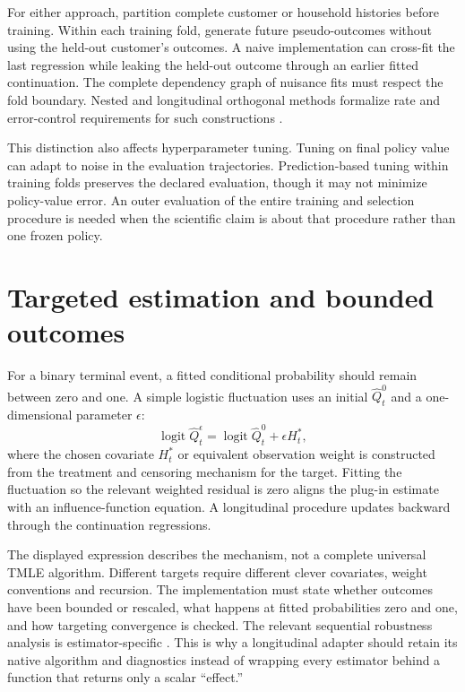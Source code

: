 For either approach, partition complete customer or household histories
before training. Within each training fold, generate future pseudo-outcomes
without using the held-out customer's outcomes. A naive implementation can
cross-fit the last regression while leaking the held-out outcome through
an earlier fitted continuation. The complete dependency graph of nuisance
fits must respect the fold boundary. Nested and longitudinal orthogonal
methods formalize rate and error-control requirements for such constructions
\citep{nested2022,singh2022}.

This distinction also affects hyperparameter tuning. Tuning on final policy
value can adapt to noise in the evaluation trajectories. Prediction-based
tuning within training folds preserves the declared evaluation, though it
may not minimize policy-value error. An outer evaluation of the entire
training and selection procedure is needed when the scientific claim is
about that procedure rather than one frozen policy.

\section{Targeted estimation and bounded outcomes}
For a binary terminal event, a fitted conditional probability should remain
between zero and one. A simple logistic fluctuation uses an initial
$\widehat Q_t^0$ and a one-dimensional parameter $\epsilon$:
\[
 \operatorname{logit}\widehat Q_t^\epsilon
   =\operatorname{logit}\widehat Q_t^0+\epsilon H_t^*,
\]
where the chosen covariate $H_t^*$ or equivalent observation weight is
constructed from the treatment and censoring mechanism for the target.
Fitting the fluctuation so the relevant weighted residual is zero aligns
the plug-in estimate with an influence-function equation. A longitudinal
procedure updates backward through the continuation regressions.

The displayed expression describes the mechanism, not a complete universal
TMLE algorithm. Different targets require different clever covariates,
weight conventions and recursion. The implementation must state whether
outcomes have been bounded or rescaled, what happens at fitted probabilities
zero and one, and how targeting convergence is checked. The relevant
sequential robustness analysis is estimator-specific
\citep{sequentialdr2018}. This is why a longitudinal adapter should retain
its native algorithm and diagnostics instead of wrapping every estimator
behind a function that returns only a scalar ``effect.''

